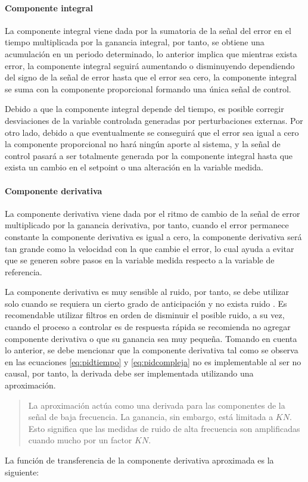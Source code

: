 			\paragraph{Componente integral}

				La componente integral viene dada por la sumatoria de la señal del error en el tiempo multiplicada por la ganancia integral, por tanto, se obtiene una acumulación en un periodo determinado, lo anterior implica que mientras exista error, la componente integral seguirá aumentando o disminuyendo dependiendo del signo de la señal de error hasta que el error sea cero, la componente integral se suma con la componente proporcional formando una única señal de control.

				Debido a que la componente integral depende del tiempo, es posible corregir desviaciones de la variable controlada generadas por perturbaciones externas. Por otro lado, debido a que eventualmente se conseguirá que el error sea igual a cero la componente proporcional no hará ningún aporte al sistema, y la señal de control pasará a ser totalmente generada por la componente integral hasta que exista un cambio en el setpoint o una alteración en la variable medida.

			\paragraph{Componente derivativa}

				La componente derivativa viene dada por el ritmo de cambio de la señal de error multiplicado por la ganancia derivativa, por tanto, cuando el error permanece constante la componente derivativa es igual a cero, la componente derivativa será tan grande como la velocidad con la que cambie el error, lo cual ayuda a evitar que se generen sobre pasos en la variable medida respecto a la variable de referencia.
				
				La componente derivativa es muy sensible al ruido, por tanto, se debe utilizar solo cuando se requiera un cierto grado de anticipación y no exista ruido \Parencite{smith1985principles}. Es recomendable utilizar filtros en orden de disminuir el posible ruido, a su vez, cuando el proceso a controlar es de respuesta rápida se recomienda no agregar componente derivativa o que su ganancia sea muy pequeña. Tomando en cuenta lo anterior, se debe mencionar que la componente derivativa tal como se observa en las ecuaciones \cref{eq:pidtiempo} y \cref{eq:pidcompleja} no es implementable al ser no causal, por tanto, la derivada debe ser implementada utilizando una aproximación. \blockquote[{\cite[p.220]{aastrom2002control}}]{La aproximación actúa como una derivada para las componentes de la señal de baja frecuencia. La ganancia, sin embargo, está limitada a $KN$. Esto significa que las medidas de ruido de alta frecuencia son amplificadas cuando mucho por un factor $KN$.} La función de transferencia de la componente derivativa aproximada es la siguiente:

